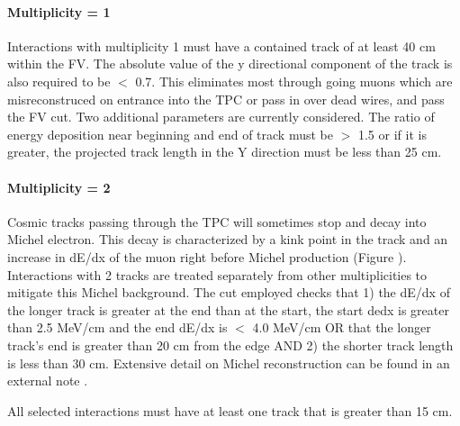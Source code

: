 \documentclass[12pt]{article}
\begin{document}
\paragraph{Multiplicity = 1}
\par Interactions with multiplicity 1 must have a contained track of at least 40 cm within the FV. The absolute value of the y directional component of the track is also required to be $<$ 0.7.  This eliminates most through going muons which are misreconstruced on entrance into the TPC or pass in over dead wires, and pass the FV cut. Two additional parameters are currently considered.  The ratio of energy deposition near beginning and end of track must be $>$ 1.5 or if it is greater, the projected track length in the Y direction must be less than 25 cm.
\paragraph{Multiplicity = 2}
\par Cosmic tracks passing through the TPC will sometimes stop and decay into Michel electron. This decay is characterized by a kink point in the track and an increase in dE/dx of the muon right before Michel production (Figure \cite{fig:michel}).  Interactions with 2 tracks are treated separately from other multiplicities to mitigate this Michel background. The cut employed checks that 1) the dE/dx of the longer track is greater at the end than at the start, the start dedx is greater than 2.5 MeV/cm and the end dE/dx is $<$ 4.0 MeV/cm OR that the longer track's end is greater than 20 cm from the edge AND 2) the shorter track length is less than 30 cm.  Extensive detail on Michel reconstruction can be found in an external note \cite{bib:michel}. 
\par All selected interactions must have at least one track that is greater than 15 cm.
\end{document}
